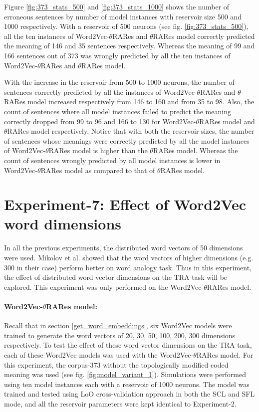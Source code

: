 Figure \ref{fig:373_stats_500} and \ref{fig:373_stats_1000} shows the number of erroneous sentences by number of model instances with reservoir size 500 and 1000 respectively. With a reservoir of 500 neurons (see fig. \ref{fig:373_stats_500}), all the ten instances of Word2Vec-$\theta$RARes and $\theta$RARes model correctly predicted the meaning of 146 and 35 sentences respectively. Whereas the meaning of 99 and 166 sentences out of 373 was wrongly predicted by all the ten instances of Word2Vec-$\theta$RARes and $\theta$RARes model. 

With the increase in the reservoir from 500 to 1000 neurons, the number of sentences correctly predicted by all the instances of Word2Vec-$\theta$RARes and $\theta$RARes model increased respectively from 146 to 160 and from 35 to 98. Also, the count of sentences where all model instances failed to predict the meaning correctly dropped from 99 to 96 and 166 to 130 for Word2Vec-$\theta$RARes model and $\theta$RARes model respectively. Notice that with both the reservoir sizes, the number of sentences whose meanings were correctly predicted by all the model instances of Word2Vec-$\theta$RARes model is higher than the $\theta$RARes model. Whereas the count of sentences wrongly predicted by all model instances is lower in Word2Vec-$\theta$RARes model as compared to that of $\theta$RARes model.



\section{Experiment-7: Effect of Word2Vec word dimensions}

In all the previous experiments, the distributed word vectors of 50 dimensions were used. Mikolov et al. \cite{w2v:mikolov_2013_efficient, w2v:mikolov_2013_distributed} showed that the word vectors of higher dimensions (e.g. 300 in their case) perform better on word analogy task. Thus in this experiment, the effect of distributed word vector dimensions on the TRA task will be explored. This experiment was only performed on the Word2Vec-$\theta$RARes model.

\paragraph{Word2Vec-$\theta$RARes model:} Recall that in section \ref{get_word_embeddings}, six Word2Vec models were trained to generate the word vectors of 20, 30, 50, 100, 200, 300 dimensions respectively. To test the effect of these word vector dimensions on the TRA task, each of these Word2Vec models was used with the Word2Vec-$\theta$RARes model. For this experiment, the corpus-373 without the topologically modified coded meaning was used (see fig. \ref{fig:model_variant_1}). Simulations were performed using ten model instances each with a reservoir of 1000 neurons. The model was trained and tested using LoO cross-validation approach in both the SCL and SFL mode, and all the reservoir parameters were kept identical to Experiment-2.

